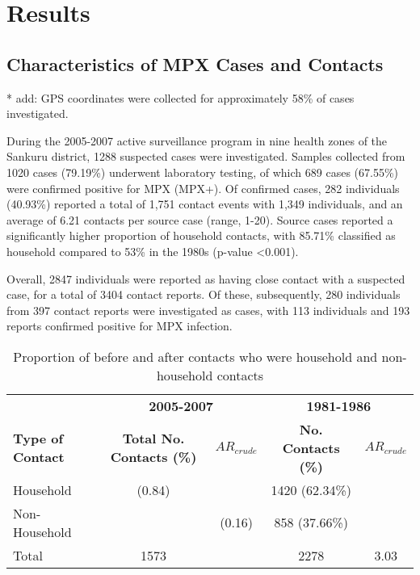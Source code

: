\section{Results}

\subsection{Characteristics of MPX Cases and Contacts}

* add: GPS coordinates were collected for approximately 58\% of cases investigated. 

During the 2005-2007 active surveillance program in nine health zones of the Sankuru district, 1288 suspected cases were investigated. Samples collected from 1020 cases (79.19\%) underwent laboratory testing, of which 689 cases (67.55\%) were confirmed positive for MPX (MPX+). Of confirmed cases, 282 individuals (40.93\%) reported a total of 1,751 contact events with 1,349 individuals, and an average of 6.21 contacts per source case (range, 1-20). Source cases reported a significantly higher proportion of household contacts, with 85.71\% classified as household compared to 53\% in the 1980s (p-value \textless 0.001).



Overall, 2847 individuals were reported as having close contact with a suspected case, for a total of 3404 contact reports. Of these, 
subsequently, 280 individuals from 397 contact reports were investigated as cases, with 113 individuals and 193 reports confirmed positive for MPX infection. 

\begin{table}
\centering
\begin{tabular}{lcccc} 
\toprule
& \multicolumn{2}{c}{\textbf{2005-2007}} & \multicolumn{2}{c}{\textbf{1981-1986}} \\
\cmidrule(l){2-3}
\textbf{Type of Contact}  &	\textbf{Total No. Contacts (\%)} &  $AR_{crude}$ &	\textbf{ No. Contacts (\%)} & $AR_{crude}$ \\
\midrule
Household  & (0.84) & ~ & 1420 (62.34\%) & ~\\
Non-Household  & ~ &	(0.16) & 858 (37.66\%) & ~ \\
\midrule
Total &	1573 & ~ & 2278 & 3.03 \\
\bottomrule
\end{tabular}
\caption{Proportion of before and after contacts who were household and non-household contacts}
\label{tab:table1}
\end{table}



